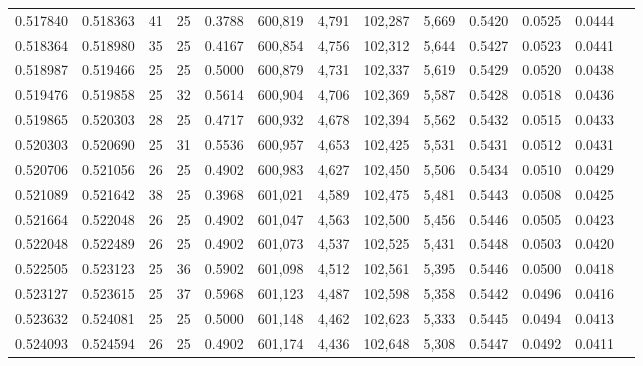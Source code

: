 \begin{tabular}{rrrrrrrrrrrrr}
0.517840 & 0.518363 &    41 &  25 &                                     0.3788 & 600,819 &   4,791 & 102,287 &   5,669 & 0.5420 & 0.0525 & 0.0444 \\
0.518364 & 0.518980 &    35 &  25 &                                     0.4167 & 600,854 &   4,756 & 102,312 &   5,644 & 0.5427 & 0.0523 & 0.0441 \\
0.518987 & 0.519466 &    25 &  25 &                                     0.5000 & 600,879 &   4,731 & 102,337 &   5,619 & 0.5429 & 0.0520 & 0.0438 \\
0.519476 & 0.519858 &    25 &  32 &                                     0.5614 & 600,904 &   4,706 & 102,369 &   5,587 & 0.5428 & 0.0518 & 0.0436 \\
0.519865 & 0.520303 &    28 &  25 &                                     0.4717 & 600,932 &   4,678 & 102,394 &   5,562 & 0.5432 & 0.0515 & 0.0433 \\
0.520303 & 0.520690 &    25 &  31 &                                     0.5536 & 600,957 &   4,653 & 102,425 &   5,531 & 0.5431 & 0.0512 & 0.0431 \\
0.520706 & 0.521056 &    26 &  25 &                                     0.4902 & 600,983 &   4,627 & 102,450 &   5,506 & 0.5434 & 0.0510 & 0.0429 \\
0.521089 & 0.521642 &    38 &  25 &                                     0.3968 & 601,021 &   4,589 & 102,475 &   5,481 & 0.5443 & 0.0508 & 0.0425 \\
0.521664 & 0.522048 &    26 &  25 &                                     0.4902 & 601,047 &   4,563 & 102,500 &   5,456 & 0.5446 & 0.0505 & 0.0423 \\
0.522048 & 0.522489 &    26 &  25 &                                     0.4902 & 601,073 &   4,537 & 102,525 &   5,431 & 0.5448 & 0.0503 & 0.0420 \\
0.522505 & 0.523123 &    25 &  36 &                                     0.5902 & 601,098 &   4,512 & 102,561 &   5,395 & 0.5446 & 0.0500 & 0.0418 \\
0.523127 & 0.523615 &    25 &  37 &                                     0.5968 & 601,123 &   4,487 & 102,598 &   5,358 & 0.5442 & 0.0496 & 0.0416 \\
0.523632 & 0.524081 &    25 &  25 &                                     0.5000 & 601,148 &   4,462 & 102,623 &   5,333 & 0.5445 & 0.0494 & 0.0413 \\
0.524093 & 0.524594 &    26 &  25 &                                     0.4902 & 601,174 &   4,436 & 102,648 &   5,308 & 0.5447 & 0.0492 & 0.0411 \\

\end{tabular}
